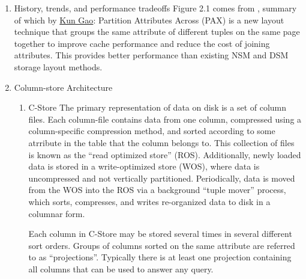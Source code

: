 \documentclass[11pt]{article}
\begin{document}
\begin{enumerate}
\item History, trends, and performance tradeoffs
\label{sec:org592c040}
Figure 2.1 comes from \cite{10.5555/645927.672367}, summary of which by \href{https://www.cs.cmu.edu/\~kgao/course/15823/ailamaki01.html}{Kun Gao}:
Partition Attributes Across (PAX) is a new layout technique that groups the same attribute of different
tuples on the same page together to improve cache performance and reduce the cost of joining attributes.
This provides better performance than existing NSM and DSM storage layout methods.
\item Column-store Architecture
\label{sec:orgf284355}
\begin{enumerate}
\item C-Store
\label{sec:orgb255ccc}
The primary representation of data on disk is a set of column files. Each column-file contains data
from one column, compressed using a column-specific compression method, and sorted according to some
atrribute in the table that the column belongs to. This collection of files is known as the ``read
optimized store'' (ROS). Additionally, newly loaded data is stored in a write-optimized store (WOS),
where data is uncompressed and not vertically partitioned. Periodically, data is moved from the WOS
into the ROS via a background ``tuple mover'' process, which sorts, compresses, and writes re-organized
data to disk in a columnar form.

Each column in C-Store may be stored several times in several different sort orders. Groups of columns
sorted on the same attribute are referred to as “projections”. Typically there is at least one
projection containing all columns that can be used to answer any query.


\end{enumerate}
\end{enumerate}
\end{document}
